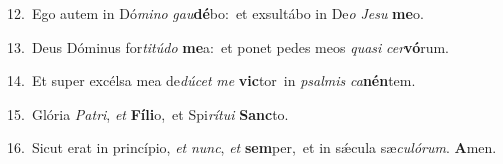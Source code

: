 {\numbfont\textcolor{\numbcolor}{12.}}~Ego autem in Dó\-\textit{mi}\-\textit{no} \textit{gau}\-\textbf{dé}bo:~\star et exsultábo in De\textit{o} \textit{Je}\-\textit{su} \textbf{me}\-o.\par
{\numbfont\textcolor{\numbcolor}{13.}}~Deus Dóminus for\-\textit{ti}\-\textit{tú}\textit{do} \textbf{me}\-a:~\star et ponet pedes meos \textit{qua}\-\textit{si} \textit{cer}\-\textbf{vó}rum.\par
{\numbfont\textcolor{\numbcolor}{14.}}~Et super excélsa mea de\-\textit{dú}\-\textit{cet} \textit{me} \textbf{vic}\-tor~\star in \textit{psal}\-\textit{mis} \textit{ca}\-\textbf{nén}tem.\par
{\numbfont\textcolor{\numbcolor}{15.}}~Glória \textit{Pa}\-\textit{tri}, \textit{et} \textbf{Fí}\-\textbf{li}o,~\star et Spi\-\textit{rí}\-\textit{tu}\textit{i} \textbf{Sanc}\-to.\par
{\numbfont\textcolor{\numbcolor}{16.}}~Sicut erat in princípio, \textit{et} \textit{nunc}\-, \textit{et} \textbf{sem}\-per,~\star et in sǽcula sæ\-\textit{cu}\-\textit{ló}\textit{rum}. \textbf{A}\-men.\par
